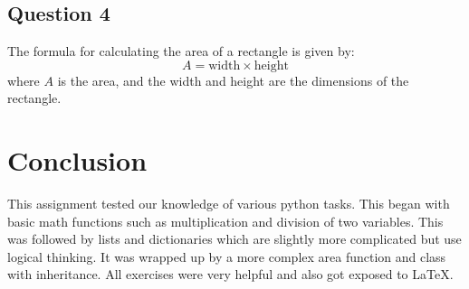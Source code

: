 \documentclass{article}
\begin{document}
\subsection{Question 4} The formula for calculating the area of a rectangle is given by:
  \[
  A = \text{width} \times \text{height}
  \]
  where \( A \) is the area, and the width and height are the dimensions of the rectangle.

\section{Conclusion}
This assignment tested our knowledge of various python tasks. This began with basic math functions such as multiplication and division of two variables. This was followed by lists and dictionaries which are slightly more complicated but use logical thinking. It was wrapped up by a more complex area function and class with inheritance. All exercises were very helpful and also got exposed to LaTeX.
\end{document}
